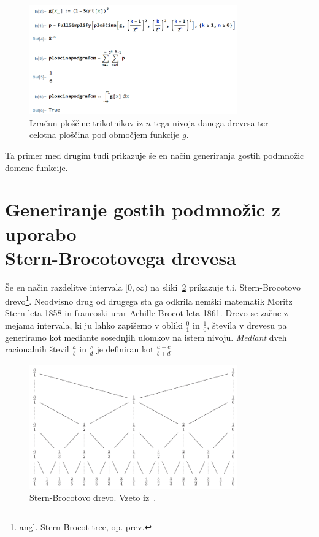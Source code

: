 \documentclass[a4paper, 12pt, titlepage]{article}
\begin{document}
\begin{figure}[h!]
    \centering
    \includegraphics[width=0.8\textwidth]{slike/ilustrativen_primer_wolfram.png}
    \caption{Izračun ploščine trikotnikov iz $ n $-tega nivoja danega drevesa ter celotna ploščina pod območjem funkcije $ g $.}
    \label{ilustrativen_primer_wolfram}
\end{figure}

Ta primer med drugim tudi prikazuje še en način generiranja gostih podmnožic domene funkcije.

\section[Generiranje gostih podmnožic z uporabo Stern-Brocotovega drevesa]{Generiranje gostih podmnožic z uporabo\\ Stern-Brocotovega drevesa }

Še en način razdelitve intervala $ [0, \infty) $ na sliki~\ref{stern-brocot_tree} prikazuje t.i. Stern-Brocotovo drevo\footnote{angl. Stern-Brocot tree, op. prev.}. Neodvisno drug od drugega sta ga odkrila nemški matematik Moritz Stern leta 1858 in francoski urar Achille Brocot leta 1861. Drevo se začne z mejama intervala, ki ju lahko zapišemo v obliki $ \frac{0}{1}$ in $ \frac{1}{0} $, števila v drevesu pa generiramo kot mediante sosednjih ulomkov na istem nivoju. \emph{Mediant} dveh racionalnih števil $ \frac{a}{b} $ in $ \frac{c}{d} $ je definiran kot $ \frac{a+c}{b+d} $.

\begin{figure}[h!]
    \centering
    \includegraphics[width=0.8\textwidth]{slike/stern-brocot_tree.png}
    \caption{Stern-Brocotovo drevo. Vzeto iz~\cite{osnovni_clanek}.}
    \label{stern-brocot_tree}
\end{figure}
\end{document}
